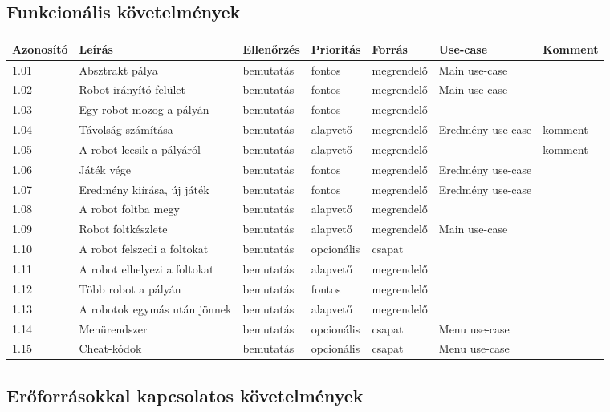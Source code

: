 \subsection{Funkcionális követelmények}


\begin{longtable}{| l | l | l | l | l | l | l |}
\hline
\textbf{Azonosító}   & \textbf{Leírás} & \textbf{Ellenőrzés} & \textbf{Prioritás} & \textbf{Forrás} & \textbf{Use-case} & \textbf{Komment} \tabularnewline
\hline\hline
1.01 & Absztrakt pálya & bemutatás & fontos & megrendelő & Main use-case & \tabularnewline
\hline
1.02 & Robot irányító felület & bemutatás & fontos & megrendelő & Main use-case & \tabularnewline
\hline
1.03 & Egy robot mozog a pályán & bemutatás & fontos & megrendelő &  & \tabularnewline
\hline
1.04 & Távolság számítása & bemutatás & alapvető & megrendelő & Eredmény use-case & komment \tabularnewline
\hline
1.05 & A robot leesik a pályáról & bemutatás & alapvető & megrendelő &  & komment \tabularnewline
\hline
1.06 & Játék vége & bemutatás & fontos & megrendelő & Eredmény use-case &  \tabularnewline
\hline
1.07 & Eredmény kiírása, új játék & bemutatás & fontos & megrendelő & Eredmény use-case &  \tabularnewline
\hline
1.08 & A robot foltba megy& bemutatás & alapvető & megrendelő &  & \tabularnewline
\hline
1.09 & Robot foltkészlete & bemutatás & alapvető & megrendelő & Main use-case &  \tabularnewline
\hline
1.10 & A robot felszedi a foltokat & bemutatás & opcionális & csapat &  &  \tabularnewline
\hline
1.11 & A robot elhelyezi a foltokat & bemutatás & alapvető & megrendelő &  &  \tabularnewline
\hline
1.12 & Több robot a pályán & bemutatás & fontos & megrendelő &  &  \tabularnewline
\hline
1.13 & A robotok egymás után jönnek & bemutatás & alapvető & megrendelő &  &  \tabularnewline
\hline
1.14 & Menürendszer & bemutatás & opcionális & csapat & Menu use-case &  \tabularnewline
\hline
1.15 & Cheat-kódok & bemutatás & opcionális & csapat & Menu use-case &  \tabularnewline
\hline
\end{longtable}

\subsection{Erőforrásokkal kapcsolatos követelmények}

